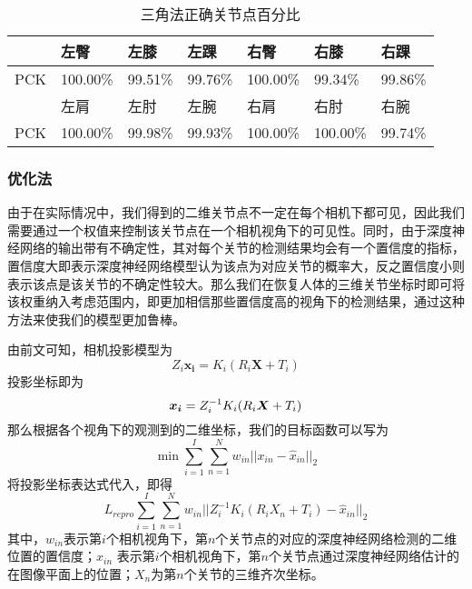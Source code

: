 \begin{table}[H]
    \centering
    \begin{tabular}{lllllll}
        \hline
             & 左臀    & 左膝   & 左踝   & 右臀    & 右膝    & 右踝   \\
        \hline
         PCK & 100.00\% & 99.51\% & 99.76\% & 100.00\% & 99.34\%  & 99.86\% \\
             & 左肩    & 左肘   & 左腕   & 右肩    & 右肘    & 右腕   \\
         PCK & 100.00\% & 99.98\% & 99.93\% & 100.00\% & 100.00\% & 99.74\% \\
        \hline
    \end{tabular}
    \caption{三角法正确关节点百分比\label{tab:3dpck}}
\end{table}


\subsubsection{优化法}
由于在实际情况中，我们得到的二维关节点不一定在每个相机下都可见，因此我们需要通过一个权值来控制该关节点在一个相机视角下的可见性。同时，由于深度神经网络的输出带有不确定性，其对每个关节的检测结果均会有一个置信度的指标，置信度大即表示深度神经网络模型认为该点为对应关节的概率大，反之置信度小则表示该点是该关节的不确定性较大。那么我们在恢复人体的三维关节坐标时即可将该权重纳入考虑范围内，即更加相信那些置信度高的视角下的检测结果，通过这种方法来使我们的模型更加鲁棒。

由前文可知，相机投影模型为
\begin{equation}
    Z_i \bm{x_i} = K_i(R_i\bm{X} + T_i)
\end{equation}
投影坐标即为
\begin{equation}
    \bm{x_i} = Z_i^{-1}K_i(R_i{\bm{X}} + T_i)
\end{equation}
那么根据各个视角下的观测到的二维坐标，我们的目标函数可以写为
\begin{equation}
    \min \sum^I_{i=1} \sum_{n=1}^N w_{in}||x_{in} - \hat x_{in}||_2
\end{equation}
将投影坐标表达式代入，即得
\begin{equation}
    L_{repro} \sum^I_{i=1} \sum_{n=1}^N w_{in}||Z_i^{-1}K_i(R_iX_n + T_i) - \hat x_{in}||_2
\end{equation}
\newcommand{\mi}{第\(i\)个}
\newcommand{\mn}{第\(n\)个}
其中，$w_{in}$表示\mi 相机视角下，\mn 关节点的对应的深度神经网络检测的二维位置的置信度；$\hat x_{in}$ 表示\mi 相机视角下，\mn 关节点通过深度神经网络估计的在图像平面上的位置；$X_n$为\mn 关节的三维齐次坐标。

